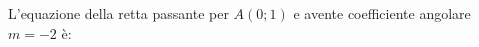 L'equazione della retta passante per \(\displaystyle A(0;1)\)
e avente coefficiente angolare \(\displaystyle m=-2\) è: